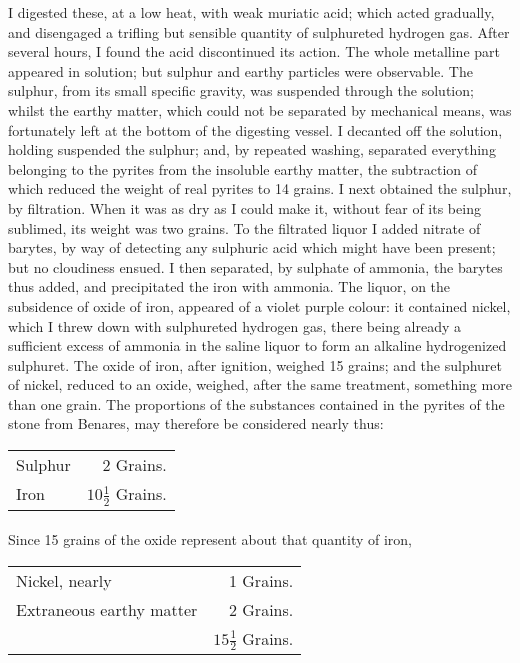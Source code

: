 \documentclass[a4paper, 12pt, oneside]{article}
\begin{document}
I digested these, at a low heat, with weak muriatic acid; which acted gradually, and disengaged a trifling but sensible quantity of sulphureted hydrogen gas. After several hours, I found the acid discontinued its action. The whole metalline part appeared in solution; but sulphur and earthy particles were observable. The sulphur, from its small specific gravity, was suspended through the solution; whilst the earthy matter, which could not be separated by mechanical means, was fortunately left at the bottom of the digesting vessel. I decanted off the solution, holding suspended the sulphur; and, by repeated washing, separated everything belonging to the pyrites from the insoluble earthy matter, the subtraction of which reduced the weight of real pyrites to 14 grains. I next obtained the sulphur, by filtration. When it was as dry as I could make it, without fear of its being sublimed, its weight was two grains. To the filtrated liquor I added nitrate of barytes, by way of detecting any sulphuric acid which might have been present; but no cloudiness ensued. I then separated, by sulphate of ammonia, the barytes thus added, and precipitated the iron with ammonia. The liquor, on the subsidence of oxide of iron, appeared of a violet purple colour: it contained nickel, which I threw down with sulphureted hydrogen gas, there being already a sufficient excess of ammonia in the saline liquor to form an alkaline hydrogenized sulphuret. The oxide of iron, after ignition, weighed 15 grains; and the sulphuret of nickel, reduced to an oxide, weighed, after the same treatment, something more than one grain. The proportions of the substances contained in the pyrites of the stone from Benares, may therefore be considered nearly thus:
\begin{table}[H]
    \centering
    \begin{tabular}{l r}
        Sulphur & 2 Grains.  \\
        Iron & $10\frac{1}{2}$ Grains. \\
    \end{tabular}
\end{table}
\paragraph{}
Since 15 grains of the oxide represent about that quantity of iron,
\begin{table}[H]
    \centering
    \begin{tabular}{l r}
        Nickel, nearly & 1 Grains.   \\
        Extraneous earthy matter & 2 Grains. \\ \hline
        ~ & $15\frac{1}{2}$ Grains. \\ 
    \end{tabular}
\end{table}
\end{document}
